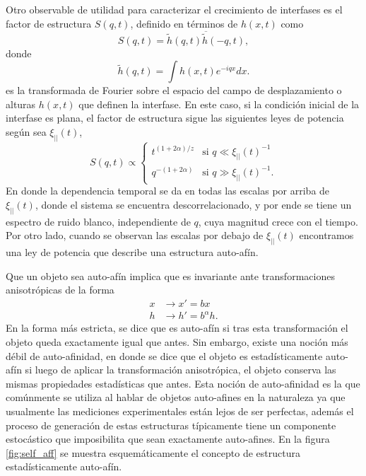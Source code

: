 
Otro observable de utilidad para caracterizar el crecimiento de interfases es el factor de estructura $S(q,t)$, definido en términos de $h(x,t)$ como
\begin{equation}
    S(q,t) = \overline{\tilde{h}(q,t)\tilde{h}(-q,t)},
\end{equation} 
donde
\begin{equation}
    \tilde{h}(q,t) = \int h(x,t) e^{-iqx} dx.
\end{equation}
es la transformada de Fourier sobre el espacio del campo de desplazamiento o alturas $h(x,t)$ que definen la interfase. En este caso, si la condición inicial de la interfase es plana, el factor de estructura sigue las siguientes leyes de potencia según sea $\xi_{||}(t)$,
\begin{equation}
    S(q,t) \propto 
    \begin{cases}
        t^{(1+2\alpha)/z} & \text{si } q \ll \xi_{||}(t)^{-1} \\
        q^{-(1+2\alpha)} & \text{si } q \gg \xi_{||}(t)^{-1}.
    \end{cases}
\end{equation}
En donde la dependencia temporal se da en todas las escalas por arriba de $\xi_{||}(t)$, donde el sistema se encuentra descorrelacionado, y por ende se tiene un espectro de ruido blanco, independiente de $q$, cuya magnitud crece con el tiempo. Por otro lado, cuando se observan las escalas por debajo de $\xi_{||}(t)$ encontramos una ley de potencia que describe una estructura auto-afín.

Que un objeto sea auto-afín implica que es invariante ante transformaciones anisotrópicas de la forma 
\begin{align}
    x &\rightarrow x' = bx \\
    h &\rightarrow h' = b^{\alpha} h.
\end{align}
En la forma más estricta, se dice que es auto-afín si tras esta transformación el objeto queda exactamente igual que antes. Sin embargo, existe una noción más débil de
auto-afinidad, en donde se dice que el objeto es estadísticamente auto-afín si luego de aplicar la transformación anisotrópica, el objeto conserva 
las mismas propiedades estadísticas que antes. Esta noción de auto-afinidad es la que comúnmente se utiliza al hablar de objetos auto-afines en la naturaleza ya 
que usualmente las mediciones experimentales están lejos de ser perfectas, además el proceso de generación de estas estructuras típicamente tiene un 
componente estocástico que imposibilita que sean exactamente auto-afines. En la figura \ref{fig:self_aff} se muestra esquemáticamente el concepto de estructura 
estadísticamente auto-afín.

